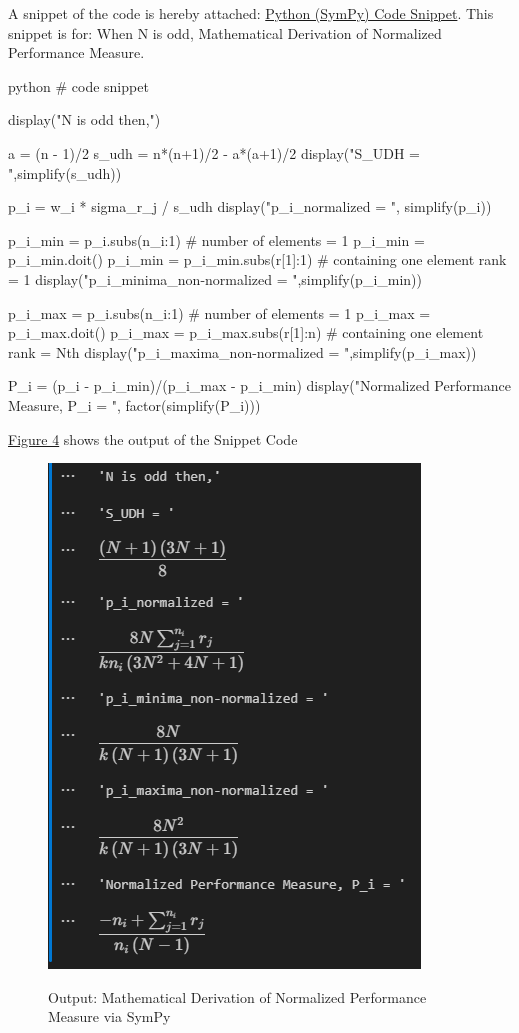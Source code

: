 \documentclass[a4paper,fleqn,review]{cas-sc}
\begin{document}
A snippet of the code is hereby attached: \hyperref[code:snippet_odd_performance_measure]{Python (SymPy) Code Snippet}. This snippet is for: When N is odd, Mathematical Derivation of Normalized Performance Measure.

 	\label{code:snippet_odd_performance_measure}
\begin{mintedbox}{python}
	# code snippet
	
	display("N is odd then,")
	
	a = (n - 1)/2
	s_udh = n*(n+1)/2 - a*(a+1)/2
	display("S_UDH = ",simplify(s_udh))
	
	p_i = w_i * sigma_r_j / s_udh
	display("p_i_normalized = ", simplify(p_i))
	
	p_i_min = p_i.subs({n_i:1}) # number of elements = 1
	p_i_min = p_i_min.doit()
	p_i_min = p_i_min.subs({r[1]:1}) # containing one element rank = 1
	display("p_i_minima_non-normalized = ",simplify(p_i_min))
	
	p_i_max = p_i.subs({n_i:1}) # number of elements = 1
	p_i_max = p_i_max.doit()
	p_i_max = p_i_max.subs({r[1]:n}) # containing one element rank = Nth
	display("p_i_maxima_non-normalized = ",simplify(p_i_max))
	
	P_i = (p_i - p_i_min)/(p_i_max - p_i_min)
	display("Normalized Performance Measure, P_i = ", factor(simplify(P_i)))
\end{mintedbox}

\hyperref[fig:output-mathematical-validation]{Figure 4} shows the output of the Snippet Code
\begin{figure}
	\caption{Output: Mathematical Derivation of Normalized Performance Measure via SymPy}
	\centering
	\includegraphics [scale=1]{output-mathematical-validation.png}
	\label{fig:output-mathematical-validation}
\end{figure}
\end{document}
